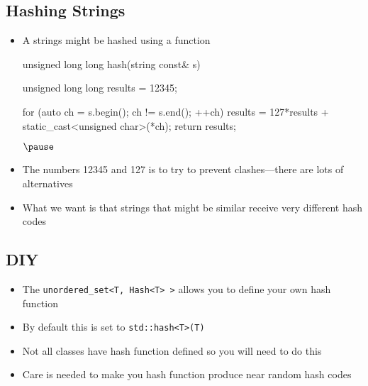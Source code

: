 
\begin{slide}
\section{Hashing Strings}

\begin{PauseHighLight}
  \begin{itemize}
  \item A strings might be hashed using a function\pause
    \begin{cpp}
      unsigned long long hash(string const& s) {
        unsigned long long results = 12345;
        
        for (auto ch = s.begin(); ch != s.end(); ++ch) {
          results = 127*results + static_cast<unsigned char>(*ch);
        }
        return results;
      }$\pause$
    \end{cpp}
  \item The numbers 12345 and 127 is to try to prevent
    clashes\pause---there are lots of alternatives\pauseb
  \item What we want is that strings that might be similar receive very
    different hash codes\pauseb
  \end{itemize}
\end{PauseHighLight}

\end{slide}


\begin{slide}
\section{DIY}

\begin{PauseHighLight}
  \begin{itemize}
  \item The \texttt{unordered\_set<T, Hash<T> >} allows you to define
    your own hash function\pause
  \item By default this is set to \texttt{std::hash<T>(T)}\pause
  \item Not all classes have hash function defined so you will need to
    do this\pause
  \item Care is needed to make you hash function produce near random
    hash codes\pause
  \end{itemize}
\end{PauseHighLight}

\end{slide}


